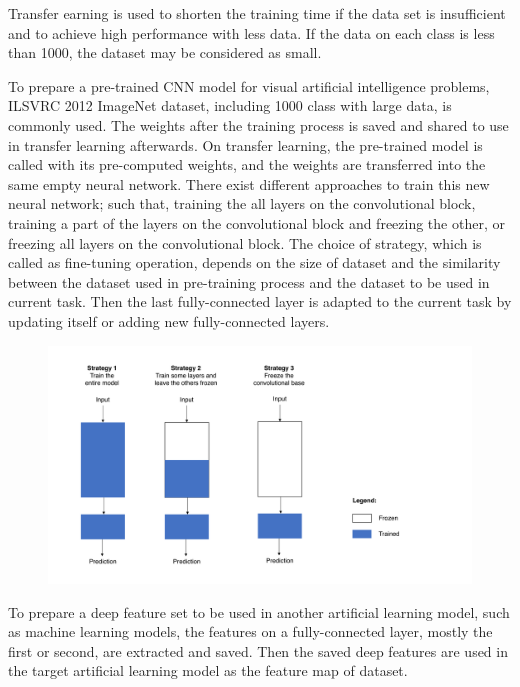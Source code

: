 Transfer earning is used to shorten the training time if the data set is insufficient and to achieve high performance with less data. If the data on each class is less than 1000, the dataset may be considered as small. 

To prepare a pre-trained CNN model for visual artificial intelligence problems, ILSVRC 2012 ImageNet \cite{imagenet} dataset, including 1000 class with large data, is commonly used. The weights after the training process is saved and shared to use in transfer learning afterwards. On transfer learning, the pre-trained model is called with its pre-computed weights, and the weights are transferred into the same empty neural network. There exist different approaches to train this new neural network; such that, training the all layers on the convolutional block, training a part of the layers on the convolutional block and freezing the other, or freezing all layers on the convolutional block. The choice of strategy, which is called as fine-tuning operation, depends on the size of dataset and the similarity between the dataset used in pre-training process and the dataset to be used in current task. Then the last fully-connected layer is adapted to the current task by updating itself or adding new fully-connected layers.

\begin{figure}[h]
    \centering
    \includegraphics[width=.8\linewidth]{fig/pretrain_strategies.png}
	\vspace*{1mm}
    \label{fig:pretrain_strategies}
\end{figure}

To prepare a deep feature set to be used in another artificial learning model, such as machine learning models, the features on a fully-connected layer, mostly the first or second, are extracted and saved. Then the saved deep features are used in the target artificial learning model as the feature map of dataset.

